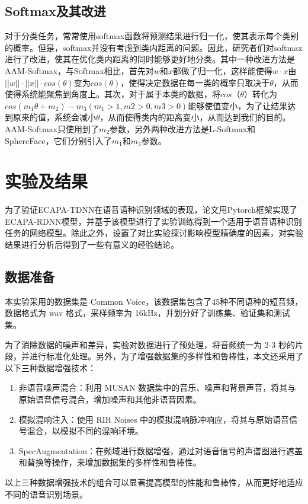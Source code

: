\section{Softmax及其改进}

对于分类任务，常常使用softmax函数将预测结果进行归一化，使其表示每个类别的概率。但是，softmax并没有考虑到类内距离的问题。因此，研究者们对softmax进行了改进，使其在优化类内距离的同时能够更好地分类。其中一种改进方法是AAM-Softmax，与Softmax相比，首先对$w$和$x$都做了归一化，这样能使得$w\cdot x$由$||w||\cdot ||x||\cdot cos(\theta)$变为$cos(\theta)$，使得决定数据在每一类的概率只取决于$\theta$，从而使得系统能聚焦到角度上。其次，对于属于本类的数据，将$cos（\theta）$转化为$cos(m_1\theta+m_2)-m_3(m_1>1,m2>0,m3>0)$能够使值变小，为了让结果达到原来的值，系统会减小$\theta$，从而使得类内的距离变小，从而达到我们的目的。AAM-Softmax只使用到了$m_2$参数，另外两种改进方法是L-Softmax和SphereFace，它们分别引入了$m_1$和$m_3$参数。


\chapter{实验及结果}
为了验证ECAPA-TDNN在语音语种识别领域的表现，论文用Pytorch框架实现了ECAPA-RDNN模型，并基于该模型进行了实验训练得到一个适用于语音语种识别任务的网络模型。除此之外，设置了对比实验探讨影响模型精确度的因素，对实验结果进行分析后得到了一些有意义的经验结论。

\section{数据准备}
本实验采用的数据集是 Common Voice，该数据集包含了45种不同语种的短音频，数据格式为 wav 格式，采样频率为 16kHz，并划分好了训练集、验证集和测试集。

为了消除数据的噪声和差异，实验对数据进行了预处理，将音频统一为 2-3 秒的片段，并进行标准化处理。另外，为了增强数据集的多样性和鲁棒性，本文还采用了以下三种数据增强技术：

\begin{enumerate}
  \item 非语音噪声混合：利用 MUSAN 数据集中的音乐、噪声和背景声音，将其与原始语音信号混合，增加噪声和其他非语音因素。
  \item 模拟混响注入：使用 RIR Noises 中的模拟混响脉冲响应，将其与原始语音信号混合，以模拟不同的混响环境。
  \item SpecAugmentation：在频域进行数据增强，通过对语音信号的声谱图进行遮盖和替换等操作，来增加数据集的多样性和鲁棒性。
\end{enumerate}
以上三种数据增强技术的组合可以显著提高模型的性能和鲁棒性，从而更好地适应不同的语音识别场景。

